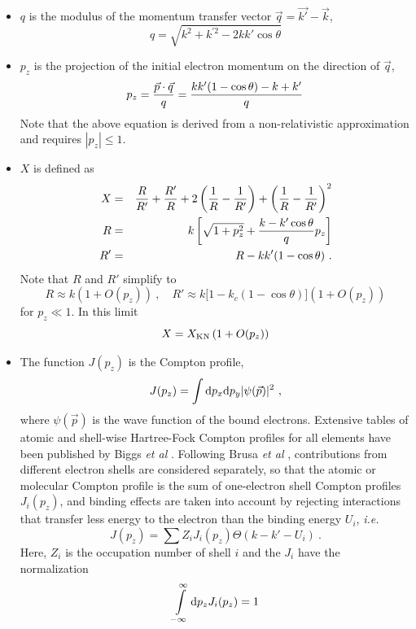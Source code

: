 \begin{itemize}
\item
$q$ is the modulus of the momentum transfer vector 
$\vec{q} = \vec{k'} - \vec{k}$, 
\begin{equation}
q = \sqrt{k^2 + k^{\prime 2} - 2 k k' \cos \theta}
\end{equation}
\item
$p_z$ is the projection of the initial electron momentum 
on the direction of $\vec{q}$,
\begin{equation}
\label{comp_pz}
p_z = {\vec{p} \cdot \vec{q} \over q} = 
{k k' (1 - \cos \theta) - k + k' \over q}
\end{equation}
Note that the above equation is derived from a non-relativistic 
approximation and requires $|p_z| \le 1$.
\item
$X$ is defined as
\begin{eqnarray}
X & = & {R \over R'} + {R' \over R} + 
2 \left(\frac{1}{R} - \frac{1}{R'} \right) 
+ \left(\frac{1}{R} - \frac{1}{R'} \right)^2 \nonumber \\
R & = & k \left[ \sqrt{1 + p_z^2} + {k - k' \cos \theta \over q} p_z \right]
\nonumber \\
R' & = & R - k k' (1 - \cos \theta)~.
\end{eqnarray} 
Note that $R$ and $R'$ simplify to 
\begin{equation}
R \approx k \left(1 + O(p_z) \right)~, \quad 
R' \approx k \Big[1 - k_c (1 - \cos \theta ) \Big] \left(1 + O(p_z) \right) 
\end{equation}
for $p_z \ll 1$. In this limit 
\begin{equation}
X = X_{\rm KN} \left(1 + O(p_z) \right)
\end{equation}
\item
The function $J(p_z)$ is the Compton profile,
\begin{equation}
J(p_z) = \int {\rm d} p_x {\rm d} p_y | \psi(\vec{p}) |^2~,
\end{equation}
where $\psi(\vec{p})$ is the wave function of the bound electrons. 
Extensive tables of atomic and shell-wise 
Hartree-Fock Compton profiles for all 
elements have been published by Biggs {\em et al} \cite{BM75}.
Following Brusa {\em et al} \cite{BS96},  
contributions 
from different electron shells are considered separately, so 
that the atomic or molecular Compton profile is the sum 
of one-electron shell Compton profiles $J_i(p_z)$, and binding effects 
are taken into account by rejecting interactions that 
transfer less energy to the electron than the binding energy $U_i$,
{\em i.e.}
\begin{equation}
J(p_z) = \sum Z_i J_i(p_z) \Theta(k - k' - U_i)~.
\end{equation}
Here, $Z_i$ is the occupation number of shell $i$ and 
the $J_i$ have the normalization
\begin{equation}
\int\limits_{-\infty}^\infty {\rm d} p_z J_i(p_z) = 1
\end{equation} 
\end{itemize}
